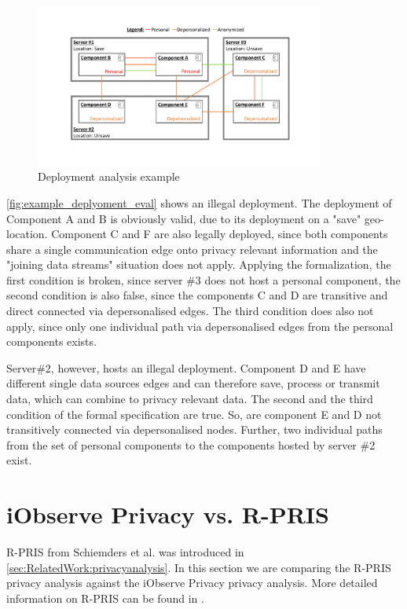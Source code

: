 \begin{figure}[h]
	\centering
	\includegraphics[trim = 35mm 30mm 30mm 25mm, clip, width=0.85\textwidth]{graphs/deployment_example_implementation_eval}
	\caption{Deployment analysis example}
	\label{fig:example_deplyoment_eval}
\end{figure}

\autoref{fig:example_deplyoment_eval} shows an illegal deployment. The deployment of Component A and B is obviously valid, due to its deployment on a "save" geo-location. Component C and F are also legally deployed, since both components share a single communication edge onto privacy relevant information and the "joining data streams" situation does not apply. Applying the formalization, the first condition is broken, since server \#3 does not host a personal component, the second condition is also false, since the components C and D are transitive and direct connected via depersonalised edges. The third condition does also not apply, since only one individual path via depersonalised edges from the personal components exists.

Server\#2, however, hosts an illegal deployment. Component D and E have different single data sources edges and can therefore save, process or transmit data, which can combine to privacy relevant data. The second and the third condition of the formal specification are true. So, are component E and D not transitively connected via depersonalised nodes. Further, two individual paths from the set of personal components to the components hosted by server \#2 exist.




\section{iObserve Privacy vs. R-PRIS}
\label{sec:PrivacyAnalysis:rpris}

R-PRIS from Schiemders et al. was introduced in \autoref{sec:RelatedWork:privacyanalysis}. In this section we are comparing the R-PRIS privacy analysis against the iObserve Privacy privacy analysis. More detailed information on R-PRIS can be found in \cite{Schmieders.}\cite{Schmieders.2015}.


